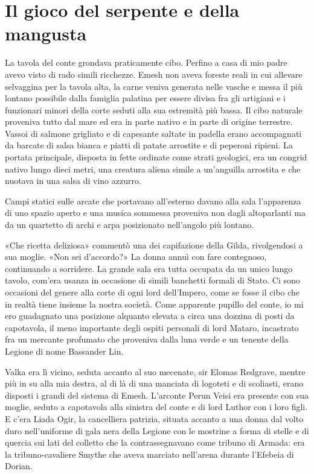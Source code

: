 \chapter{Il gioco del serpente e della mangusta}

La tavola del conte grondava praticamente cibo. Perfino a casa di mio
padre avevo visto di rado simili ricchezze. Emesh non aveva foreste
reali in cui allevare selvaggina per la tavola alta, la carne veniva
generata nelle vasche e messa il più lontano possibile dalla famiglia
palatina per essere divisa fra gli artigiani e i funzionari minori della
corte seduti alla sua estremità più bassa. Il cibo naturale proveniva
tutto dal mare ed era in parte nativo e in parte di origine terrestre.
Vassoi di salmone grigliato e di capesante saltate in padella erano
accompagnati da barcate di salsa bianca e piatti di patate arrostite e
di peperoni ripieni. La portata principale, disposta in fette ordinate
come strati geologici, era un congrid nativo lungo dieci metri, una
creatura aliena simile a un'anguilla arrostita e che nuotava in una
salsa di vino azzurro.

Campi statici sulle arcate che portavano all'esterno davano alla sala
l'apparenza di uno spazio aperto e una musica sommessa proveniva non
dagli altoparlanti ma da un quartetto di archi e arpa posizionato
nell'angolo più lontano.

«Che ricetta deliziosa» commentò una dei capifazione della Gilda,
rivolgendosi a sua moglie. «Non sei d'accordo?» La donna annuì con fare
contegnoso, continuando a sorridere. La grande sala era tutta occupata
da un unico lungo tavolo, com'era usanza in occasione di simili
banchetti formali di Stato. Ci sono occasioni del genere alla corte di
ogni lord dell'Impero, come se fosse il cibo che in realtà tiene insieme
la nostra società. Come apparente pupillo del conte, io mi ero
guadagnato una posizione alquanto elevata a circa una dozzina di posti
da capotavola, il meno importante degli ospiti personali di lord Mataro,
incastrato fra un mercante profumato che proveniva dalla luna verde e un
tenente della Legione di nome Bassander Lin.

Valka era lì vicino, seduta accanto al suo mecenate, sir Elomas
Redgrave, mentre più in su alla mia destra, al di là di una manciata di
logoteti e di scoliasti, erano disposti i grandi del sistema di Emesh.
L'arconte Perun Veisi era presente con sua moglie, seduto a capotavola
alla sinistra del conte e di lord Luthor con i loro figli. E c'era Liada
Ogir, la cancelliera patrizia, situata accanto a una donna dal volto
duro nell'uniforme di gala nera della Legione con le mostrine a forma di
stelle e di quercia sui lati del colletto che la contrassegnavano come
tribuno di Armada: era la tribuno-cavaliere Smythe che aveva marciato
nell'arena durante l'Efebeia di Dorian.

